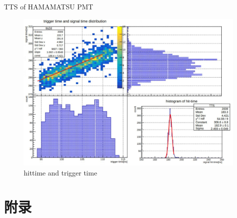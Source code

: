 \begin{frame}
\end{frame}

\begin{frame}
\end{frame}


\begin{frame}{TTS of HAMAMATSU PMT}
\begin{figure}
\centering
\includegraphics[width=.8\textwidth]{figures/hamtts.JPG} %
\caption{hittime and trigger time}
\end{figure}
\end{frame}

\appendix

\section*{附录}
